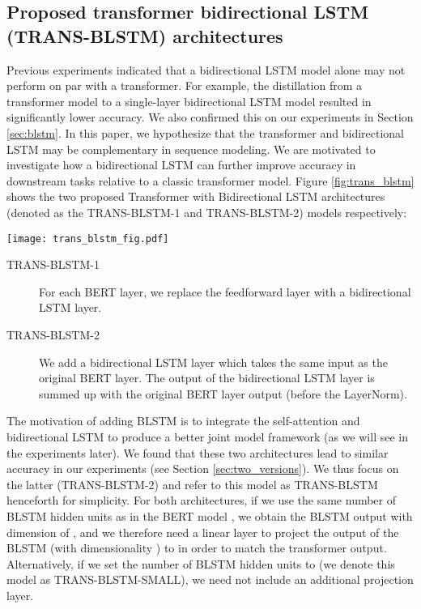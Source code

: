 \documentclass[11pt,a4paper]{article}
\begin{document}
\subsection{Proposed transformer bidirectional LSTM (TRANS-BLSTM) architectures} \label{sec:trans_blstm}
Previous experiments indicated that a bidirectional LSTM model alone may not perform on par with a transformer. For example, the distillation from a transformer model to a single-layer bidirectional LSTM model \cite{tang2019} resulted in significantly lower accuracy. We also confirmed this on our experiments in Section \ref{sec:blstm}. In this paper, we hypothesize that the transformer and bidirectional LSTM may be complementary in sequence modeling. We are motivated to investigate how a bidirectional LSTM can further improve accuracy in downstream tasks relative to a classic transformer model. Figure \ref{fig:trans_blstm} shows the two proposed Transformer with Bidirectional LSTM architectures (denoted as the TRANS-BLSTM-1 and TRANS-BLSTM-2) models respectively: 
\begin{figure*}[!hbt]
    \centering
    \texttt{[image: trans\_blstm\_fig.pdf]}
    \caption{Two transformer with bidirectional LSTM architectures. The left one, TRANS-BLSTM-1, replaces the feedforward layer with BLSTM layer and the right , TRANS-BLSTM-2, adds a BLSTM layer in parallel.}
    \label{fig:trans_blstm}
\end{figure*}
\begin{description}
\item[TRANS-BLSTM-1] For each BERT layer, we replace the feedforward layer with a bidirectional LSTM layer.
\item[TRANS-BLSTM-2]  We add a bidirectional LSTM layer which takes the same input as the original BERT layer. The output of the bidirectional LSTM layer is summed up with the original BERT layer output (before the LayerNorm). 
\end{description}
The motivation of adding BLSTM is to integrate the self-attention and bidirectional LSTM to produce a better joint model framework (as we will see in the experiments later). We found that these two architectures lead to similar accuracy in our experiments (see Section \ref{sec:two_versions}). We thus focus on the latter (TRANS-BLSTM-2) and refer to this model as TRANS-BLSTM henceforth for simplicity. For both architectures, if we use the same number of BLSTM hidden units as in the BERT model , we obtain the BLSTM output with dimension of , and we therefore need a linear layer to project the output of the BLSTM (with dimensionality ) to  in order to match the transformer output. Alternatively, if we set the number of BLSTM hidden units to  (we denote this model as TRANS-BLSTM-SMALL), we need not include an additional projection layer.  
\end{document}
